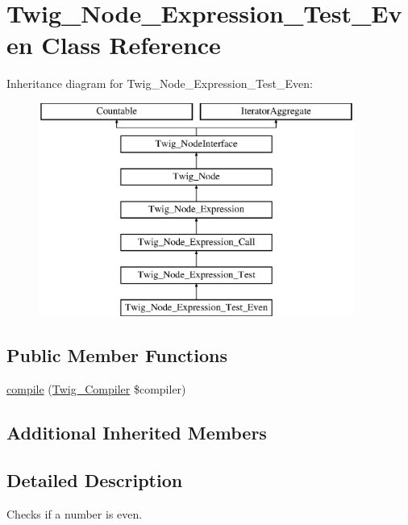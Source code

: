 \hypertarget{class_twig___node___expression___test___even}{}\section{Twig\+\_\+\+Node\+\_\+\+Expression\+\_\+\+Test\+\_\+\+Even Class Reference}
\label{class_twig___node___expression___test___even}
Inheritance diagram for Twig\+\_\+\+Node\+\_\+\+Expression\+\_\+\+Test\+\_\+\+Even\+:\begin{figure}[H]
\begin{center}
\leavevmode
\includegraphics[height=7.000000cm]{class_twig___node___expression___test___even}
\end{center}
\end{figure}
\subsection*{Public Member Functions}
\begin{DoxyCompactItemize}
\item 
\hyperlink{class_twig___node___expression___test___even_a4e0faa87c3fae583620b84d3607085da}{compile} (\hyperlink{class_twig___compiler}{Twig\+\_\+\+Compiler} \$compiler)
\end{DoxyCompactItemize}
\subsection*{Additional Inherited Members}


\subsection{Detailed Description}
Checks if a number is even.


